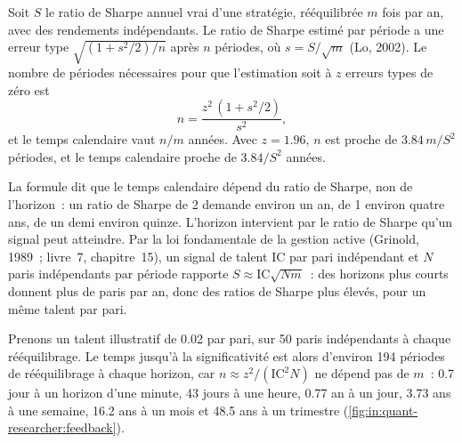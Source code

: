 \begin{method}\label{met:in:quant-researcher:time}
Soit $S$ le ratio de Sharpe annuel vrai d'une stratégie, rééquilibrée $m$ fois par an, avec des rendements indépendants. Le ratio de Sharpe estimé
par période a une erreur type $\sqrt{(1+s^2/2)/n}$ après $n$ périodes, où $s=S/\sqrt m$ (Lo, 2002). Le
nombre de périodes nécessaires pour que l'estimation soit à $z$ erreurs types de zéro est
\[
n=\frac{z^2\,(1+s^2/2)}{s^2},
\]
et le temps calendaire vaut $n/m$ années. Avec $z=1.96$, $n$ est proche de $3.84\,m/S^2$ périodes, et le temps calendaire proche de
$3.84/S^2$ années.
\end{method}

La formule dit que le temps calendaire dépend du ratio de Sharpe, non de l'horizon~: un ratio de Sharpe de 2 demande environ un an, de 1 environ
quatre ans, de un demi environ quinze. L'horizon intervient par le ratio de Sharpe qu'un signal peut atteindre.
Par la loi fondamentale de la gestion active (Grinold, 1989~; livre~7, chapitre~15), un signal de talent $\mathrm{IC}$ par
pari indépendant et $N$ paris indépendants par période rapporte $S\approx \mathrm{IC}\sqrt{N m}$~: des horizons plus courts donnent plus de paris
par an, donc des ratios de Sharpe plus élevés, pour un même talent par pari.

\begin{example}\label{ex:in:quant-researcher:law}
Prenons un talent illustratif de 0.02 par pari, sur 50 paris indépendants à chaque rééquilibrage. Le temps jusqu'à la significativité est alors d'environ
194 périodes de rééquilibrage à chaque horizon, car $n\approx z^2/(\mathrm{IC}^2N)$ ne dépend pas de $m$~: 0.7 jour à un
horizon d'une minute, 43 jours à une heure, 0.77 an à un jour, 3.73 ans à une semaine, 16.2 ans à un mois et 48.5
ans à un trimestre (\cref{fig:in:quant-researcher:feedback}).
\end{example}

